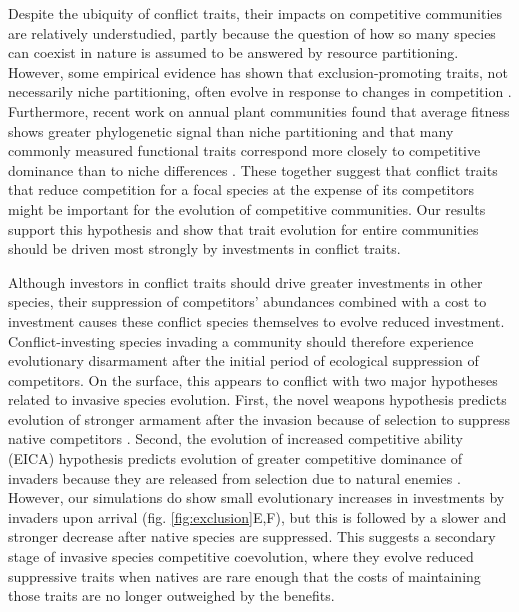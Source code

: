 Despite the ubiquity of conflict traits, their impacts on competitive
communities are relatively understudied, partly because the question of 
how so many species can coexist in nature is assumed to be answered by 
resource partitioning. However, some empirical evidence has shown that
exclusion-promoting traits, not necessarily niche partitioning, often 
evolve in response to changes in competition 
\citep{Germain2020, Hart2019, Miller2014, Zhao2016}.
Furthermore, recent work on annual plant communities
found that average fitness shows greater phylogenetic signal than niche
partitioning \citep{Godoy2014} and that many commonly measured
functional traits correspond more closely to competitive dominance than
to niche differences \citep{Kraft2015}. These together suggest
that conflict traits that reduce competition for a focal species at the
expense of its competitors might be important for the evolution of
competitive communities. Our results support this hypothesis and show
that trait evolution for entire communities should be driven most
strongly by investments in conflict traits.

Although investors in conflict traits should drive greater investments
in other species, their suppression of competitors' abundances combined
with a cost to investment causes these conflict species themselves to
evolve reduced investment. Conflict-investing species invading a
community should therefore experience evolutionary disarmament after the
initial period of ecological suppression of competitors. On the surface,
this appears to conflict with two major hypotheses related to invasive
species evolution. First, the novel weapons hypothesis predicts
evolution of stronger armament after the invasion because of selection
to suppress native competitors \citep{Callaway2004,
Inderjit2006}. Second, the evolution of increased competitive
ability (EICA) hypothesis predicts evolution of greater competitive
dominance of invaders because they are released from selection due to
natural enemies \citep{Blossey1995}. However, our simulations do
show small evolutionary increases in investments by invaders upon
arrival (fig. \ref{fig:exclusion}E,F), but this is followed by a slower and stronger
decrease after native species are suppressed. This suggests a secondary
stage of invasive species competitive coevolution, where they evolve
reduced suppressive traits when natives are rare enough that the costs
of maintaining those traits are no longer outweighed by the benefits.

